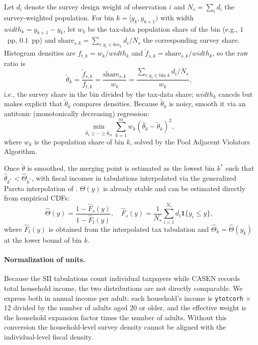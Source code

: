 Let $d_i$ denote the survey design weight of observation $i$ and $N_s=\sum_{i} d_i$ the survey-weighted population. For bin $k=[y_k,y_{k+1})$ with width $width_k=y_{k+1}-y_k$, let $w_k$ be the tax-data population share of the bin (e.g., $1$~pp, $0.1$~pp) and $\text{share}_{s,k}=\sum_{i: y_i\in bin_k} d_i/N_s$ the corresponding survey share. Histogram densities are $f_{t,k}=w_k/width_k$ and $\tilde{f}_{s,k}=\text{share}_{s,k}/width_k$, so the raw ratio is
\begin{equation*}
\tilde{\theta}_{k}= \frac{\tilde{f}_{s,k}}{f_{t,k}} = \frac{\text{share}_{s,k}}{w_k}= \frac{\sum_{i: y_i \in \text{bin }k} d_i/N_s}{w_k},
\end{equation*}
i.e., the survey share in the bin divided by the tax-data share; $width_k$ cancels but makes explicit that $\tilde{\theta}_k$ compares densities. Because $\tilde{\theta}_{k}$ is noisy, \citet{blanchet2022weight} smooth it via an antitonic (monotonically decreasing) regression:
\begin{equation}
    \min_{\hat{\theta}_{1}\ge \cdots \ge \hat{\theta}_{m}} \sum_{k=1}^{m} w_{k} (\hat{\theta}_{k} - \tilde{\theta}_{k})^{2},
    \label{eq:antitonic}
\end{equation}
where $w_{k}$ is the population share of bin $k$, solved by the Pool Adjacent Violators Algorithm. 

Once $\tilde{\theta}$ is smoothed, the merging point is estimated as the lowest bin $k^{*}$ such that $\hat{\theta}_{k^{*}} < \hat{\Theta}_{k^{*}}$, with fiscal incomes in tabulations interpolated via the generalized Pareto interpolation of \citet{blanchet2022generalized}. $\Theta(y)$ is already stable and can be estimated directly from empirical CDFs:
\begin{equation}
    \hat{\Theta}(y)=\frac{1-\hat{F}_{s}(y)}{1-\hat{F}_{t}(y)}, \quad 
    \hat{F}_{s}(y)=\frac{1}{N_s}\sum_{i=1}^{N_s} d_i\mathbf{1}\{y_i \le y\},
    \label{eq:Theta-hat}
\end{equation}
where $\hat{F}_{t}(y)$ is obtained from the interpolated tax tabulation and $\hat{\Theta}_{k}=\hat{\Theta}(y_k)$ at the lower bound of bin $k$.

\paragraph{Normalization of units.}
Because the SII tabulations count individual taxpayers while CASEN records total household income, the two distributions are not directly comparable. We express both in annual income per adult: each household's income is \texttt{ytotcorh} $\times$ 12 divided by the number of adults aged 20 or older, and the effective weight is the household expansion factor times the number of adults. Without this conversion the household-level survey density cannot be aligned with the individual-level fiscal density.

